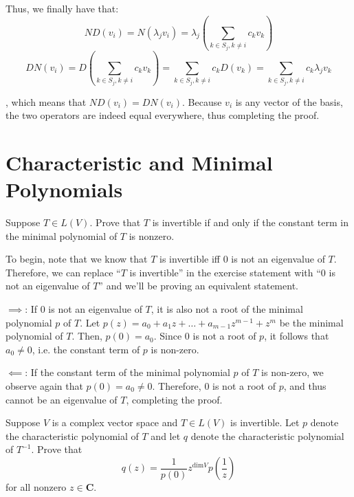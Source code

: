 \begin{solution}
    Thus, we finally have that:
    $$ND(v_i) = N(\lambda_j v_i) = \lambda_j(\sum_{k \in S_j, k \neq i} c_k v_k)$$ 
    $$DN(v_i) = D(\sum_{k \in S_j, k \neq i} c_k v_k) = \sum_{k \in S_j, k \neq i} c_k D(v_k) = \sum_{k \in S_j, k \neq i} c_k \lambda_j v_k $$
    
    , which means that $ND(v_i) = DN(v_i)$. Because $v_i$ is any vector of the basis, the two operators are indeed equal everywhere, thus completing the proof.
\end{solution}

\section{Characteristic and Minimal Polynomials}

\begin{exercise}{8}
    Suppose $T \in L(V)$. Prove that $T$ is invertible if and only if the constant term in the minimal polynomial of \(T\) is nonzero.
\end{exercise}

\begin{solution}

    To begin, note that we know that \(T\) is invertible iff 0 is not an eigenvalue of \(T\). Therefore, we can replace ``\(T\) is invertible'' in the exercise statement with ``0 is not an eigenvalue of \(T\)'' and we'll be proving an equivalent statement.

    $\implies$: If 0 is not an eigenvalue of $T$, it is also not a root of the minimal polynomial $p$ of $T$. Let $p(z) = a_0 + a_1z + \ldots + a_{m-1}z^{m-1} + z^m$ be the minimal polynomial of $T$. Then, $p(0) = a_0$. Since 0 is not a root of $p$, it follows that $a_0 \neq 0$, i.e. the constant term of $p$ is non-zero.

    $\impliedby$: If the constant term of the minimal polynomial $p$ of $T$ is non-zero, we observe again that $p(0) = a_0 \neq 0$. Therefore, 0 is not a root of $p$, and thus cannot be an eigenvalue of $T$, completing the proof.
\end{solution}

\begin{exercise}{10}
    Suppose $V$ is a complex vector space and $T \in L(V)$ is invertible. Let $p$ denote the characteristic polynomial of $T$ and let $q$ denote the characteristic polynomial of $T^{-1}$. Prove that
    $$q(z) = \frac{1}{p(0)}z^{\text{dim} V}p(\frac{1}{z})$$
    for all nonzero $z \in \mathbf{C}$.
\end{exercise}

